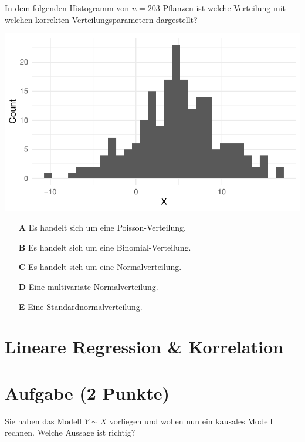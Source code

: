 \documentclass[a4paper, 9pt]{scrartcl}\usepackage[]{graphicx}\usepackage[]{xcolor}
\makeatletter
\def\maxwidth{ %
  \ifdim\Gin@nat@width>\linewidth
    \linewidth
  \else
    \Gin@nat@width
  \fi
}
\makeatother
\begin{document}
In dem folgenden Histogramm von $n = 203$ Pflanzen ist welche
Verteilung mit welchen korrekten Verteilungsparametern dargestellt?



{\centering \includegraphics[width=\maxwidth]{img/mc-distribution-02-a-1} 

}







\begin{enumerate}
\item [\textbf{A} \msquare] Es handelt sich um eine Poisson-Verteilung.
\item [\textbf{B} \msquare] Es handelt sich um eine Binomial-Verteilung.
\item [\textbf{C} \msquare] Es handelt sich um eine Normalverteilung.
\item [\textbf{D} \msquare] Eine multivariate Normalverteilung.
\item [\textbf{E} \msquare] Eine Standardnormalverteilung.
\end{enumerate} 
\section*{Lineare Regression \& Korrelation}

\section{Aufgabe \hfill (2 Punkte)}




Sie haben das Modell $Y \sim X$ vorliegen und wollen nun ein
kausales Modell rechnen. Welche Aussage ist richtig?
\end{document}
